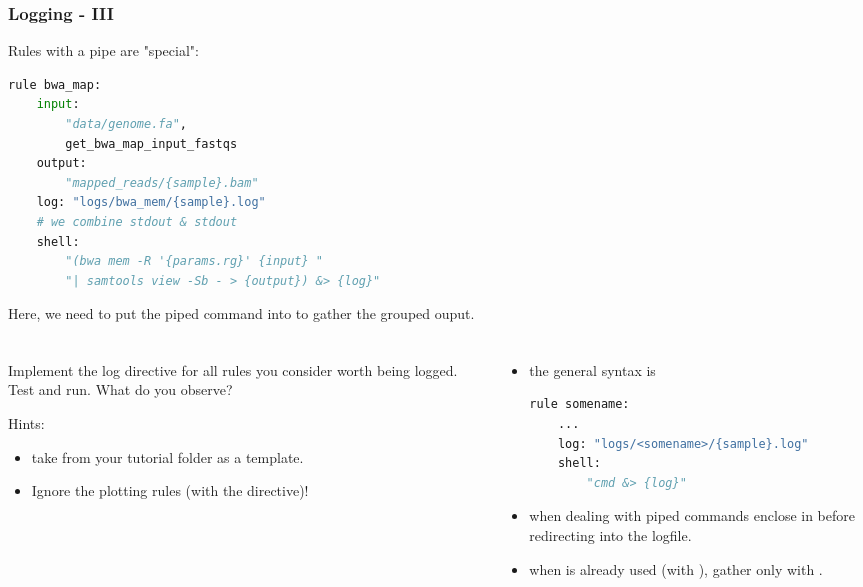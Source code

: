 \begin{frame}[fragile]
  \frametitle{Logging - III}
  Rules with a pipe are "special":  
  \begin{lstlisting}[language=Python,style=Python]
rule bwa_map:
    input:
        "data/genome.fa",
        get_bwa_map_input_fastqs
    output:
        "mapped_reads/{sample}.bam"
    log: "logs/bwa_mem/{sample}.log"
    # we combine stdout & stdout
    shell:
        "(bwa mem -R '{params.rg}' {input} "
        "| samtools view -Sb - > {output}) &> {log}"
   \end{lstlisting}
   \begin{docs}[Background]
     Here, we need to put the piped command into \altverb{()} to gather the grouped ouput. 
   \end{docs}
\end{frame}



\begin{frame}[fragile]
  \frametitle{}
  \begin{columns}
  	\begin{column}{0.5\textwidth}
  		\begin{task}
  			Implement the log directive for all rules you consider worth being logged. Test and run. What do you observe?
  		\end{task}
  	    \bcinfo Hints:
  	    \begin{itemize}
  	    	\item take  from your tutorial folder as a template.
  	    	\item \bcattention Ignore the plotting rules (with the  directive)!
  	    \end{itemize}
  	\end{column}
    \begin{column}{0.5\textwidth}
        \begin{itemize}
        	\item the general syntax is
        	      	\begin{lstlisting}[language=Python,style=Python]
rule somename:
    ...
    log: "logs/<somename>/{sample}.log"
    shell:
        "cmd &> {log}"
        	       \end{lstlisting}
            \item when dealing with piped commands enclose in   before redirecting into the logfile.
            \item when  is already used (with \altverb{>}), gather only  with .
        \end{itemize}
    \end{column}
  \end{columns}
\end{frame}

